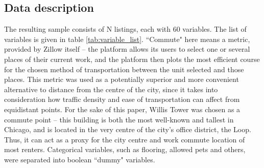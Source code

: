 \documentclass[12pt]{report}
\begin{document}
\subsection{Data description}

The resulting sample consists of N listings, each with 60 variables. The list of variables is given in table \ref{tab:variable_list}. ``Commute" here means a metric, provided by Zillow itself -- the platform allows its users to select one or several places of their current work, and the platform then plots the most efficient course for the chosen method of transportation between the unit selected and those places. This metric was used as a potentially superior and more convenient alternative to distance from the centre of the city, since it takes into consideration how traffic density and ease of transportation can affect from equidistant points. For the sake of this paper, Willis Tower was chosen as a commute point -- this building is both the most well-known and tallest in Chicago, and is located in the very centre of the city's office district, the Loop. Thus, it can act as a proxy for the city centre and work commute location of most renters. Categorical variables, such as flooring, allowed pets and others, were separated into boolean ``dummy" variables.
\end{document}
